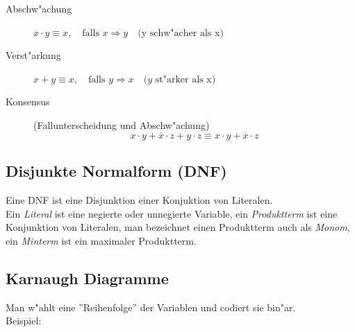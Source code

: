 \documentclass[german, 10pt, a4paper, twocolumn]{scrartcl}
\theoremstyle{definition}
\begin{document}
\begin{description}
	\item[Abschw"achung] $x\cdotp y\equiv x, \quad \mbox{falls } x\Rightarrow y\quad ($y$\mbox{ schw"acher als }$x$)$
	\item[Verst"arkung] $x+y \equiv x, \quad \mbox{falls } y\Rightarrow x \quad (y \mbox{ st"arker als }$x$)$
	\item[Konsensus] (Fallunterscheidung und Abschw"achung)
		\begin{displaymath}
			x\cdotp y + \overline{x} \cdotp z + y \cdotp z \equiv x \cdotp y + \overline{x}\cdotp z
		\end{displaymath}
\end{description}

\subsection{Disjunkte Normalform (DNF)}

Eine DNF ist eine Disjunktion einer Konjuktion von Literalen.\\

Ein \textit{Literal} ist eine negierte oder unnegierte Variable, ein \textit{Produktterm} ist eine Konjunktion von Literalen, man bezeichnet einen Produktterm auch als \textit{Monom}, ein \textit{Minterm} ist ein maximaler Produktterm.

\subsection{Karnaugh Diagramme}

Man w"ahlt eine ''Reihenfolge'' der Variablen und codiert sie bin"ar.\\

 Beispiel:
\end{document}
